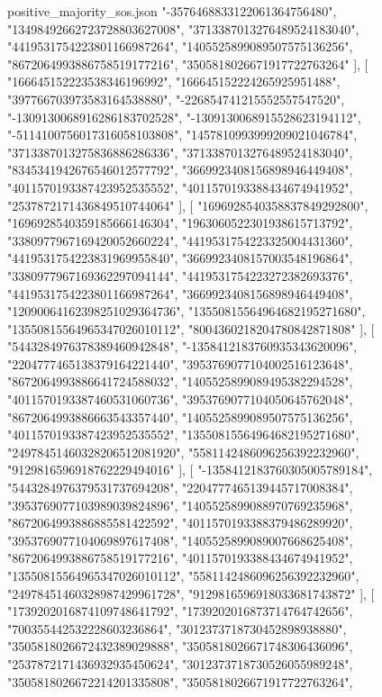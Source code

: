 \begin{filecontents*}[overwrite]{positive_majority_sos.json}
    "-3576468833122061364756480",
    "13498492662723728803627008",
    "3713387013276489524183040",
    "4419531754223801166987264",
    "1405525899089507575136256",
    "8672064993886758519177216",
    "3505818026671917722763264"
   ],
   [
    "166645152223538346196992",
    "166645152224265925951488",
    "397766703973583164538880",
    "-226854741215552557547520",
    "-1309130068916286183702528",
    "-1309130068915528623194112",
    "-5114100756017316058103808",
    "1457810993999209021046784",
    "3713387013275836886286336",
    "3713387013276489524183040",
    "8345341942676546012577792",
    "3669923408156898946449408",
    "4011570193387423952535552",
    "4011570193388434674941952",
    "2537872171436849510744064"
   ],
   [
    "1696928540358837849292800",
    "1696928540359185666146304",
    "1963060522301938615713792",
    "3380977967169420052660224",
    "4419531754223325004431360",
    "4419531754223831969955840",
    "3669923408157003548196864",
    "3380977967169362297094144",
    "4419531754223272382693376",
    "4419531754223801166987264",
    "3669923408156898946449408",
    "12090064162398251029364736",
    "13550815564964682195271680",
    "13550815564965347026010112",
    "8004360218204780842871808"
   ],
   [
    "5443284976378389460942848",
    "-1358412183760935343620096",
    "2204777465138379164221440",
    "3953769077104002516123648",
    "8672064993886641724588032",
    "1405525899089495382294528",
    "4011570193387460531060736",
    "3953769077104050645762048",
    "8672064993886663543357440",
    "1405525899089507575136256",
    "4011570193387423952535552",
    "13550815564964682195271680",
    "24978451460328206512081920",
    "5581142486096256392232960",
    "9129816596918762229494016"
   ],
   [
    "-1358412183760305005789184",
    "5443284976379531737694208",
    "2204777465139445717008384",
    "3953769077103989039824896",
    "1405525899088970769235968",
    "8672064993886885581422592",
    "4011570193388379486289920",
    "3953769077104069897617408",
    "1405525899089007668625408",
    "8672064993886758519177216",
    "4011570193388434674941952",
    "13550815564965347026010112",
    "5581142486096256392232960",
    "24978451460328987429961728",
    "9129816596918033681743872"
   ],
   [
    "1739202016874109748641792",
    "1739202016873714764742656",
    "700355442532228603236864",
    "3012373718730452898938880",
    "3505818026672432389029888",
    "3505818026671748306436096",
    "2537872171436932935450624",
    "3012373718730526055989248",
    "3505818026672214201335808",
    "3505818026671917722763264",

\end{filecontents*}
